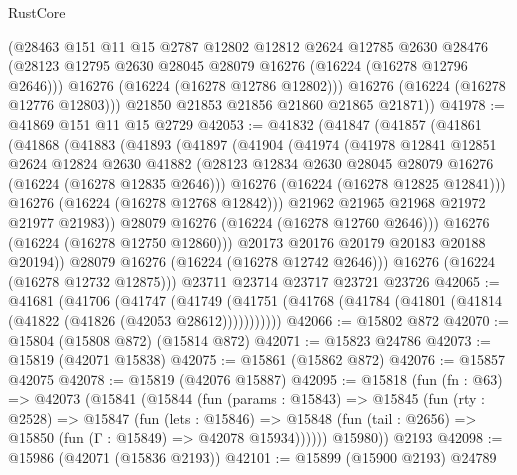 \begin{lexlean}{RustCore}
\begin{coremodule}
          (@28463
            @151
            @11
            @15
            @2787
            @12802
            @12812
            @2624
            @12785
            @2630
            @28476
            (@28123 @12795 @2630 @28045 @28079 @16276 (@16224 (@16278 @12796 @2646)))
            @16276
            (@16224 (@16278 @12786 @12802)))
          @16276
          (@16224 (@16278 @12776 @12803)))
        @21850
        @21853
        @21856
        @21860
        @21865
        @21871))
@41978 := @41869 @151 @11 @15 @2729
@42053 := @41832
    (@41847
      (@41857
        (@41861
          (@41868
            (@41883
              (@41893
                (@41897
                  (@41904
                    (@41974
                      (@41978
                        @12841
                        @12851
                        @2624
                        @12824
                        @2630
                        @41882
                        (@28123 @12834 @2630 @28045 @28079 @16276 (@16224 (@16278 @12835 @2646)))
                        @16276
                        (@16224 (@16278 @12825 @12841)))
                      @16276
                      (@16224 (@16278 @12768 @12842)))
                    @21962
                    @21965
                    @21968
                    @21972
                    @21977
                    @21983))
                @28079
                @16276
                (@16224 (@16278 @12760 @2646)))
              @16276
              (@16224 (@16278 @12750 @12860)))
            @20173
            @20176
            @20179
            @20183
            @20188
            @20194))
        @28079
        @16276
        (@16224 (@16278 @12742 @2646)))
      @16276
      (@16224 (@16278 @12732 @12875)))
    @23711
    @23714
    @23717
    @23721
    @23726
@42065 := @41681
    (@41706
      (@41747
        (@41749 (@41751 (@41768 (@41784 (@41801 (@41814 (@41822 (@41826 (@42053 @28612)))))))))))
@42066 := @15802 @872
@42070 := @15804 (@15808 @872) (@15814 @872)
@42071 := @15823 @24786
@42073 := @15819 (@42071 @15838)
@42075 := @15861 (@15862 @872)
@42076 := @15857 @42075
@42078 := @15819 (@42076 @15887)
@42095 := @15818
    (fun (fn : @63) =>
    @42073
      (@15841
        (@15844
          (fun (params : @15843) =>
          @15845
            (fun (rty : @2528) =>
            @15847
              (fun (lets : @15846) =>
              @15848 (fun (tail : @2656) => @15850 (fun (Γ : @15849) => @42078 @15934))))))
        @15980))
    @2193
@42098 := @15986 (@42071 (@15836 @2193))
@42101 := @15899 (@15900 @2193) @24789

\end{coremodule}
\end{lexlean}
